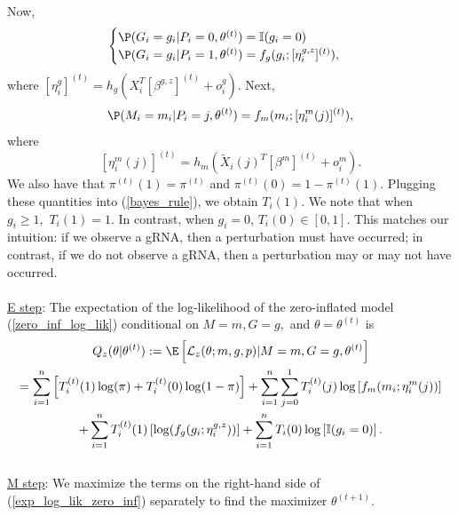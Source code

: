 \documentclass[12pt]{article}
\begin{document}
Now,
$$\begin{cases}
\P(G_i = g_i | P_i = 0, \theta^{(t)}) = \mathbb{I}(g_i = 0) \\
\P(G_i = g_i | P_i = 1, \theta^{(t)}) = f_g(g_i; [\eta^{g, z}_i]^{(t)}),
\end{cases}$$ where $[\eta^g_i]^{(t)} = h_g\left( X_i^T [\beta^{g,z}]^{(t)} + o_i^g\right).$ Next, 
$$\P( M_i = m_i | P_i = j, \theta^{(t)}) = f_m(m_i; [\eta^m_i(j)]^{(t)}),$$ where $$ [\eta^m_i(j)]^{(t)} = h_m ( \tilde{X}_i(j)^T [ \beta^m ]^{(t)} + o^m_i).$$ We also have that $\pi^{(t)}(1) = \pi^{(t)}$ and  $\pi^{(t)}(0) = 1 - \pi^{(t)}(1)$. Plugging these quantities into (\ref{bayes_rule}), we obtain $T_i(1)$. We note that when $g_i \geq 1,$ $T_i(1) = 1$. In contrast, when $g_i = 0$, $T_i(0) \in [0,1].$ This matches our intuition: if we observe a gRNA, then a perturbation must have occurred; in contrast, if we do not observe a gRNA, then a perturbation may or may not have occurred.
\\ \\
\noindent
\underline{E step}: The expectation of the log-likelihood of the zero-inflated model (\ref{zero_inf_log_lik}) conditional on $M = m, G = g,$ and $\theta = \theta^{(t)}$ is
\begin{multline}\label{exp_log_lik_zero_inf} Q_z(\theta |\theta^{(t)}) :=  \E \left[ \mathcal{L}_z(\theta; m, g, p) | M = m, G = g, \theta^{(t)} \right] \\ = \sum_{i=1}^n \left[ T^{(t)}_i(1)\log(\pi) + T_i^{(t)}(0) \log(1 - \pi)\right] + \sum_{i=1}^n \sum_{j=0}^1 T^{(t)}_i(j) \log \left[ f_m( m_i; \eta_i^m(j)) \right] \\ + \sum_{i=1}^n T_i^{(t)}(1) \left[ \log( f_g(g_i; \eta_i^{g, z}))\right] + \sum_{i=1}^n T_i(0) \log \left[ \mathbb{I}(g_i = 0) \right].
\end{multline}
\\ \noindent
\underline{M step}: We maximize the terms on the right-hand side of (\ref{exp_log_lik_zero_inf}) separately to find the maximizer $\theta^{(t+1)}$.
\end{document}

